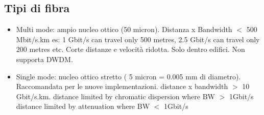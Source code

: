 \documentclass[8pt]{extarticle}
\begin{document}
\subsection{Tipi di fibra}
\begin{itemize}
	\item Multi mode: ampio nucleo ottico (50 micron). Distanza x Bandwidth $<$ 500 Mbit/s.km es: 1 Gbit/s can travel only 500 metres, 2.5 Gbit/s can travel only 200 metres etc. Corte distanze e velocità ridotta. Solo dentro edifici. Non supporta DWDM.
	\item Single mode: nucleo ottico stretto ( 5 micron = 0.005 mm di diametro). Raccomandata per le nuove implementazioni. distance x bandwidth $>$ 10 Gbit/s.km. distance limited by chromatic dispersion where BW $>$ 1Gbit/s distance limited by attenuation where BW $<$ 1Gbit/s
\end{itemize}
\end{document}
